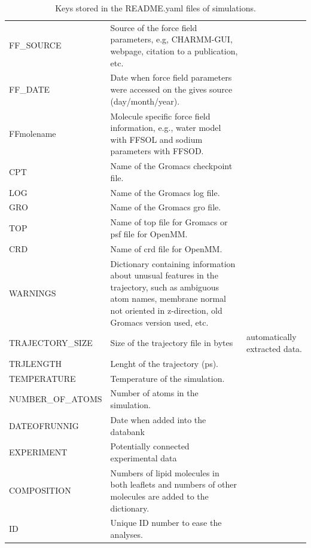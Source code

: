 \documentclass[fleqn,10pt]{wlscirep}
\begin{document}
\begin{table}[p]
\begin{tabular}{  p{3.5cm}  p{9.5cm}  p{4.0cm} }
    FF\_SOURCE & Source of the force field parameters, e.g, CHARMM-GUI, webpage, citation to a publication, etc. & \\
    FF\_DATE &  Date when force field parameters were accessed on the gives source (day/month/year). & \\
    FF{molename} & Molecule specific force field information, e.g., water model with FFSOL and sodium parameters with FFSOD. & \\
    CPT & Name of the Gromacs checkpoint file. & \\
    LOG & Name of the Gromacs log file. & \\
    GRO & Name of the Gromacs gro file. & \\
    TOP & Name of top file for Gromacs or psf file for OpenMM. & \\
    CRD & Name of crd file for OpenMM. & \\
    WARNINGS & Dictionary containing information about unusual features in the trajectory, such as ambiguous atom names, membrane normal not oriented in z-direction, old Gromacs version used, etc. & \\
    \hline
    TRAJECTORY\_SIZE & Size of the trajectory file in bytes & automatically extracted data. \\
    TRJLENGTH & Lenght of the trajectory (ps). & \\
    TEMPERATURE & Temperature of the simulation. & \\
    NUMBER\_OF\_ATOMS & Number of atoms in the simulation. & \\
    DATEOFRUNNIG & Date when added into the databank & \\
    EXPERIMENT & Potentially connected experimental data & \\
    COMPOSITION & Numbers of lipid molecules in both leaflets and numbers of other molecules are added to the dictionary. & \\
    ID & Unique ID number to ease the analyses. & \\
    \end{tabular}
    \caption{Keys stored in the README.yaml files of simulations.}
    \label{tab:READMEkeys}
\end{table}
\end{document}
